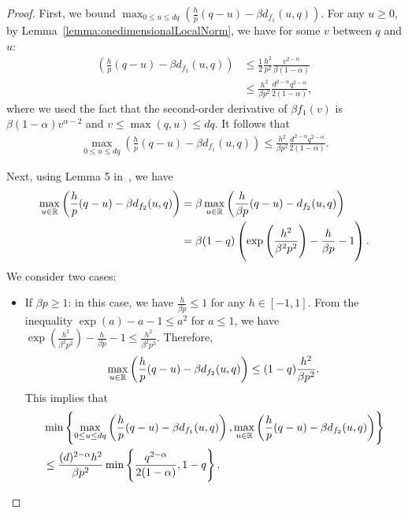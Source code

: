 \begin{proof}
    First, we bound $\max_{0 \leq u \leq dq}\left(\frac{h}{p}(q - u) - \beta d_{f_1}(u, q)\right)$. For any $u \geq 0$, by Lemma~\ref{lemma:onedimensionalLocalNorm}, we have for some $v$ between $q$ and $u$:
    \begin{align}
        \left(\frac{h}{p}(q - u) - \beta d_{f_1}(u, q)\right) &\leq \frac{1}{2}\frac{h^2}{p^2}\frac{v^{2-\alpha}}{\beta(1-\alpha)} \\
        &\leq \frac{h^2}{\beta p^2} \frac{d^{2-\alpha} q^{2-\alpha}}{2(1-\alpha)},        
    \end{align}
    where we used the fact that the second-order derivative of $\beta f_1(v)$ is $\beta (1-\alpha) v^{\alpha - 2}$ and $v \leq \max(q, u) \leq dq$. It follows that
    \begin{align}
        \max_{0 \leq u \leq dq}\left(\frac{h}{p}(q - u) - \beta d_{f_1}(u, q)\right) \leq \frac{h^2}{\beta p^2} \frac{d^{2-\alpha} q^{2-\alpha}}{2(1-\alpha)}.
        \label{eq:boundStabilityByLocalNormCoordinateWiseSPM1}
    \end{align}

    Next, using Lemma 5 in~\cite{ItoCOLT2022aVariance}, we have
    \begin{align*}
        \max_{u \in \mathbb{R}}\left(\frac{h}{p}(q - u) - \beta d_{f_2}(u, q)\right) &= \beta \max_{u \in \mathbb{R}}\left(\frac{h}{\beta p}(q - u) - d_{f_2}(u, q)\right) \\
        &= \beta(1-q)\left(\exp\left(\frac{h^2}{\beta^2 p^2}\right) - \frac{h}{\beta p} - 1 \right).
    \end{align*}
    We consider two cases:
    \begin{itemize}
        \item If $\beta p \geq 1$: in this case, we have $\frac{h}{\beta p} \leq 1$ for any $h \in [-1,1]$. From the inequality $\exp(a) - a - 1 \leq a^2$ for $a \leq 1$, we have $\exp\left(\frac{h^2}{\beta^2 p^2}\right) - \frac{h}{\beta p} - 1 \leq \frac{h^2}{\beta^2 p^2}$. Therefore,
        \begin{align*}
            \max_{u \in \mathbb{R}}\left(\frac{h}{p}(q - u) - \beta d_{f_2}(u, q)\right) \leq (1-q)\frac{h^2}{\beta p^2}.
        \end{align*}
        This implies that
        \begin{align*}
            &\min\left\{ \max_{0 \leq u \leq dq}\left(\frac{h}{p}(q - u) - \beta d_{f_1}(u, q)\right), \max_{u \in \mathbb{R}}\left(\frac{h}{p}(q - u) - \beta d_{f_2}(u, q)\right) \right\} \\
            &\leq \frac{(d)^{2-\alpha}h^2}{\beta p^2} \min\left\{ \frac{q^{2-\alpha}}{2(1-\alpha)}, 1-q \right\}.
        \end{align*}


\end{itemize}
\end{proof}
